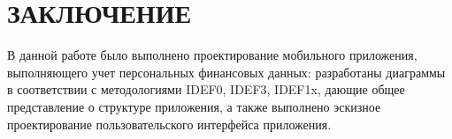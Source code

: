 \section*{ЗАКЛЮЧЕНИЕ}

В данной работе было выполнено проектирование мобильного приложения,
выполняющего учет персональных финансовых данных:
разработаны диаграммы в соответствии с методологиями
IDEF0, IDEF3, IDEF1x, дающие общее представление о структуре приложения,
а также выполнено эскизное проектирование пользовательского
интерфейса приложения.
